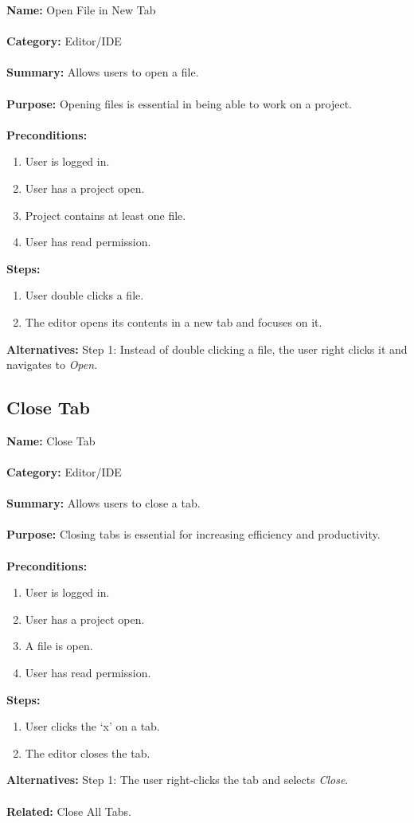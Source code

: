 \documentclass[14pt, a4paper]{article}
\begin{document}
\begin{framed}
	\noindent\textbf{Name:} Open File in New Tab \\ \\
	\textbf{Category:} Editor/IDE \\ \\
	\textbf{Summary:} Allows users to open a file. \\ \\
	\textbf{Purpose:} Opening files is essential in being able to work on a project. \\ \\
	\textbf{Preconditions:} 
	\begin{enumerate}
		\item User is logged in.
		\item User has a project open.
		\item Project contains at least one file.
		\item User has read permission.
	\end{enumerate}		
	\textbf{Steps:}
	\begin{enumerate}
		\item User double clicks a file.
		\item The editor opens its contents in a new tab and focuses on it.
	\end{enumerate}	
	\textbf{Alternatives:} Step 1: Instead of double clicking a file, the user right clicks it and navigates to \textit{Open}.
\end{framed}
\newpage

\subsection{Close Tab}

\begin{framed}
	\noindent\textbf{Name:} Close Tab \\ \\
	\textbf{Category:} Editor/IDE \\ \\
	\textbf{Summary:} Allows users to close a tab. \\ \\
	\textbf{Purpose:} Closing tabs is essential for increasing efficiency and productivity. \\ \\
	\textbf{Preconditions:} 
	\begin{enumerate}
		\item User is logged in.
		\item User has a project open.
		\item A file is open.
		\item User has read permission.
	\end{enumerate}		
	\textbf{Steps:}
	\begin{enumerate}
		\item User clicks the `x' on a tab.
		\item The editor closes the tab.
	\end{enumerate}	
	\textbf{Alternatives:} Step 1: The user right-clicks the tab and selects \textit{Close}. \\ \\
	\textbf{Related:} Close All Tabs.
\end{framed}
\end{document}
